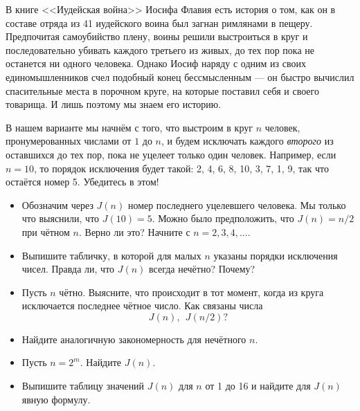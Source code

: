 
В книге <<Иудейская война>> Иосифа Флавия есть история о том, как он в составе отряда из 41 иудейского воина был загнан римлянами в пещеру. Предпочитая самоубийство плену, воины решили выстроиться в круг и последовательно убивать каждого третьего из живых, до тех пор пока не останется ни одного человека. Однако Иосиф наряду с одним из своих единомышленников счел подобный конец бессмысленным --- он быстро вычислил спасительные места в порочном круге, на которые поставил себя и своего товарища. И лишь поэтому мы знаем его историю.

В нашем варианте мы начнём с того, что выстроим в круг $n$ человек, пронумерованных числами от $1$ до $n$, и будем исключать каждого {\itshape второго} из оставшихся до тех пор, пока не уцелеет только один человек. Например, если $n = 10$, то порядок исключения будет такой: 2, 4, 6, 8, 10, 3, 7, 1, 9, так что остаётся номер 5. Убедитесь в этом!
\begin{itemize}
\item Обозначим через $J(n)$ номер последнего уцелевшего человека. Мы только что выяснили, что $J(10) = 5$. Можно было предположить, что $J(n) = n/2$ при чётном $n$. Верно ли это? Начните с $n = 2,3,4,\ldots$.
\item Выпишите табличку, в которой для малых $n$ указаны порядки исключения чисел. Правда ли, что $J(n)$ всегда нечётно? Почему?
\item Пусть $n$ чётно. Выясните, что происходит в тот момент, когда из круга исключается последнее чётное число. Как связаны числа
$$J(n), \ \ J(n/2)\text{?}$$
\item Найдите аналогичную закономерность для нечётного $n$.
\item Пусть $n = 2^m$. Найдите $J(n)$.
\item Выпишите таблицу значений $J(n)$ для $n$ от 1 до 16 и найдите для $J(n)$ явную формулу.
\end{itemize}